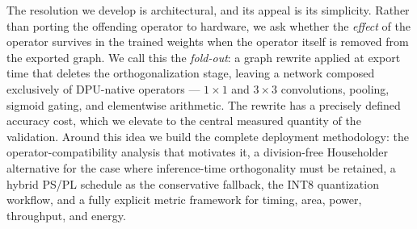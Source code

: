 \documentclass[onecolumn,journal]{IEEEtran}
\begin{document}
The resolution we develop is architectural, and its appeal is its simplicity. Rather
than porting the offending operator to hardware, we ask whether the \emph{effect} of the
operator survives in the trained weights when the operator itself is removed from the
exported graph. We call this the \emph{fold-out}: a graph rewrite applied at export time
that deletes the orthogonalization stage, leaving a network composed exclusively of
DPU-native operators --- $1{\times}1$ and $3{\times}3$ convolutions, pooling, sigmoid
gating, and elementwise arithmetic. The rewrite has a precisely defined accuracy cost,
which we elevate to the central measured quantity of the validation. Around this idea we
build the complete deployment methodology: the operator-compatibility analysis that
motivates it, a division-free Householder alternative for the case where inference-time
orthogonality must be retained, a hybrid PS/PL schedule as the conservative fallback,
the INT8 quantization workflow, and a fully explicit metric framework for timing, area,
power, throughput, and energy.
\end{document}
